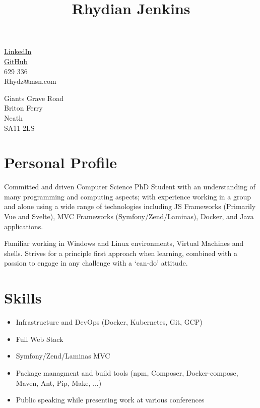 \documentclass[10pt]{article}
\title{\bfseries\Huge Rhydian Jenkins}
\date{}
\author{}
\begin{document}
\maketitle \vspace{-7em}

\section*{}
\begin{minipage}{0.5\textwidth}
	\faLinkedin \quad \href{https://www.linkedin.com/in/rhydian-jenkins-30309085/}{LinkedIn}\\
	\faGithub \quad \href{https://github.com/RhydianJenkins}{GitHub}\\
	\faPhone {} 629 336\\
	\faEnvelope \quad Rhydz@msn.com
\end{minipage}
\begin{minipage}{0.5\textwidth}
    \begin{flushright}
	Giants Grave Road\\
	Briton Ferry\\
	Neath\\
    SA11 2LS
    \end{flushright}
\end{minipage}

\section*{Personal Profile}
\noindent Committed and driven Computer Science PhD Student with an understanding of many programming and computing aspects; with experience working in a group and alone using a wide range of technologies including JS Frameworks (Primarily Vue and Svelte), MVC Frameworks (Symfony/Zend/Laminas), Docker, and Java applications.

\noindent Familiar working in Windows and Linux environments, Virtual Machines and shells. Strives for a principle first approach when learning, combined with a passion to engage in any challenge with a `can-do' attitude.

\section*{Skills}
\begin{itemize} \setlength\itemsep{-0.25em}
	\item Infrastructure and DevOps (Docker, Kubernetes, Git, GCP)
	\item Full Web Stack
	\item Symfony/Zend/Laminas MVC
	\item Package managment and build tools (npm, Composer, Docker-compose, Maven, Ant, Pip, Make, ...)
	\item Public speaking while presenting work at various conferences
\end{itemize}
\end{document}

